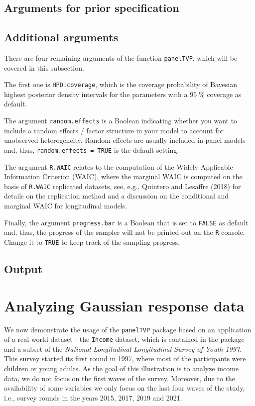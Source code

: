 \documentclass[a4paper, preprint, 3p,
authoryear]{elsarticle} %
\begin{document}
\subsection{Arguments for prior
specification}\label{arguments-for-prior-specification}

\subsection{Additional arguments}\label{additional-arguments}

There are four remaining arguments of the function \texttt{panelTVP},
which will be covered in this subsection.

The first one is \texttt{HPD.coverage}, which is the coverage
probability of Bayesian highest posterior density intervals for the
parameters with a \(95 \; \%\) coverage as default.

The argument \texttt{random.effects} is a Boolean indicating whether you
want to include a random effects / factor structure in your model to
account for unobserved heterogeneity. Random effects are usually
included in panel models and, thus, \texttt{random.effects = TRUE} is
the default setting.

The argument \texttt{R.WAIC} relates to the computation of the Widely
Applicable Information Criterion (WAIC), where the marginal WAIC is
computed on the basis of \texttt{R.WAIC} replicated datasets, see, e.g.,
Quintero and Lesaffre (2018) for details on the replication method and a
discussion on the conditional and marginal WAIC for longitudinal models.

Finally, the argument \texttt{progress.bar} is a Boolean that is set to
\texttt{FALSE} as default and, thus, the progress of the sampler will
not be printed out on the \texttt{R}-console. Change it to \texttt{TRUE}
to keep track of the sampling progress.

\subsection{Output}\label{output}

\section{Analyzing Gaussian response
data}\label{analyzing-gaussian-response-data}

We now demonstrate the usage of the \texttt{panelTVP} package based on
an application of a real-world dataset - the \texttt{Income} dataset,
which is contained in the package and a subset of the
\textit{National Longitudinal Longitudinal Survey of Youth 1997}. This
survey started its first round in 1997, where most of the participants
were children or young adults. As the goal of this illustration is to
analyze income data, we do not focus on the first waves of the survey.
Moreover, due to the availability of some variables we only focus on the
last four waves of the study, i.e., survey rounds in the years 2015,
2017, 2019 and 2021.
\end{document}
